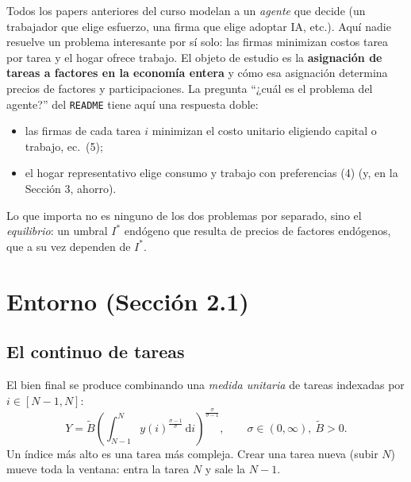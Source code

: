 \documentclass[11pt,a4paper]{article}
\theoremstyle{definition}
\theoremstyle{plain}
\theoremstyle{remark}
\numberwithin{equation}{section}
\newcommand{\Is}{I^{*}}
\newcommand{\Bt}{\tilde B}
\newcommand{\dd}{\,\mathrm{d}}
\begin{document}
Todos los papers anteriores del curso modelan a un \emph{agente} que decide (un trabajador que elige esfuerzo, una
firma que elige adoptar IA, etc.). Aquí nadie resuelve un problema interesante por sí solo: las firmas minimizan
costos tarea por tarea y el hogar ofrece trabajo. El objeto de estudio es la \textbf{asignación de tareas a factores
en la economía entera} y cómo esa asignación determina precios de factores y participaciones. La pregunta ``¿cuál es
el problema del agente?'' del \texttt{README} tiene aquí una respuesta doble:
\begin{itemize}[nosep]
  \item las firmas de cada tarea $i$ minimizan el costo unitario eligiendo capital o trabajo, ec.~(5);
  \item el hogar representativo elige consumo y trabajo con preferencias (4) (y, en la Sección 3, ahorro).
\end{itemize}
Lo que importa no es ninguno de los dos problemas por separado, sino el \emph{equilibrio}: un umbral $\Is$ endógeno que
resulta de precios de factores endógenos, que a su vez dependen de $\Is$.

\section{Entorno (Sección 2.1)}

\subsection{El continuo de tareas}
El bien final se produce combinando una \emph{medida unitaria} de tareas indexadas por $i\in[N-1,N]$:
\begin{equation}\label{eq:Y}
  Y=\Bt\left(\int_{N-1}^{N} y(i)^{\frac{\sigma-1}{\sigma}}\dd i\right)^{\frac{\sigma}{\sigma-1}},
  \qquad \sigma\in(0,\infty),\ \Bt>0. \tag{ec.~1}
\end{equation}
Un índice más alto es una tarea más compleja. Crear una tarea nueva (subir $N$) mueve toda la ventana: entra la
tarea $N$ y sale la $N-1$.
\end{document}
